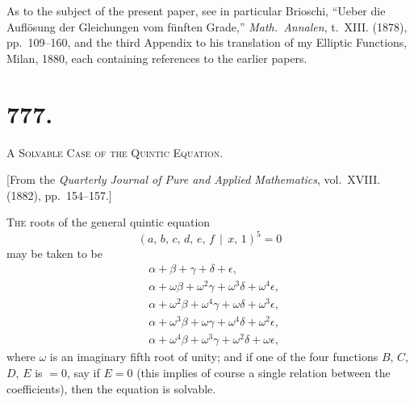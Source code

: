 \documentclass[11pt,a4paper]{book}
\begin{document}
As to the subject of the present paper, see in particular Brioschi, ``Ueber die Aufl\"{o}sung der Gleichungen vom f\"{u}nften Grade,'' \textit{Math.\ Annalen}, t.~XIII. (1878), pp.~109--160, and the third Appendix to his translation of my Elliptic Functions, Milan, 1880, each containing references to the earlier papers.

\newpage

\section*{777.}

\begin{center}
\Large\scshape A Solvable Case of the Quintic Equation.
\end{center}

\begin{center}
[From the \textit{Quarterly Journal of Pure and Applied Mathematics}, vol.~XVIII. (1882), pp.~154--157.]
\end{center}

\textsc{The} roots of the general quintic equation
\[
(a,\, b,\, c,\, d,\, e,\, f \,\!\!\mid\!\!\, x,\, 1)^{5} = 0
\]
may be taken to be
\begin{align*}
&\alpha + \beta + \gamma + \delta + \epsilon,\\
&\alpha + \omega\beta + \omega^{2}\gamma + \omega^{3}\delta + \omega^{4}\epsilon,\\
&\alpha + \omega^{2}\beta + \omega^{4}\gamma + \omega\delta + \omega^{3}\epsilon,\\
&\alpha + \omega^{3}\beta + \omega\gamma + \omega^{4}\delta + \omega^{2}\epsilon,\\
&\alpha + \omega^{4}\beta + \omega^{3}\gamma + \omega^{2}\delta + \omega\epsilon,
\end{align*}
where $\omega$ is an imaginary fifth root of unity; and if one of the four functions $B$, $C$, $D$, $E$ is $=0$, say if $E=0$ (this implies of course a single relation between the coefficients), then the equation is solvable.
\end{document}

